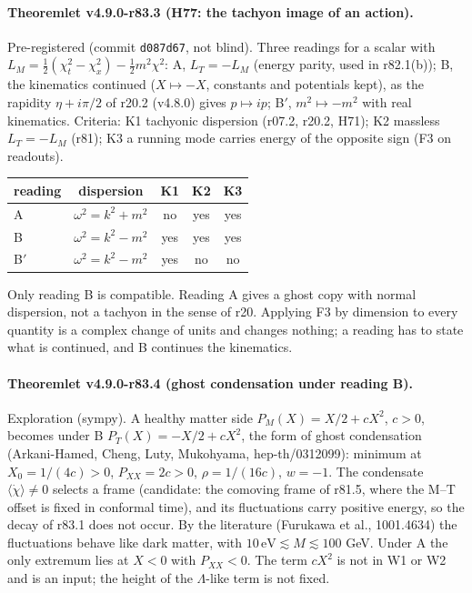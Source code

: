 \paragraph{Theoremlet v4.9.0-r83.3 (H77: the tachyon image of an action).}
Pre-registered (commit \texttt{d087d67}, not blind).  Three readings for a scalar with \(L_M=\tfrac12(\chi_t^2-\chi_x^2)-\tfrac12m^2\chi^2\):
A, \(L_T=-L_M\) (energy parity, used in r82.1(b)); B, the kinematics continued (\(X\mapsto-X\), constants and potentials kept), as the
rapidity \(\eta+i\pi/2\) of r20.2 (v4.8.0) gives \(p\mapsto ip\); B\('\), \(m^2\mapsto-m^2\) with real kinematics.  Criteria: K1 tachyonic
dispersion (r07.2, r20.2, H71); K2 massless \(L_T=-L_M\) (r81); K3 a running mode carries energy of the opposite sign (F3 on readouts).
\begin{center}
\small
\begin{tabular}{@{}lcccc@{}}
\toprule
reading & dispersion & K1 & K2 & K3\\
\midrule
A & \(\omega^2=k^2+m^2\) & no & yes & yes\\
B & \(\omega^2=k^2-m^2\) & yes & yes & yes\\
B\('\) & \(\omega^2=k^2-m^2\) & yes & no & no\\
\bottomrule
\end{tabular}
\end{center}
Only reading B is compatible.  Reading A gives a ghost copy with normal dispersion, not a tachyon in the sense of r20.  Applying F3 by
dimension to every quantity is a complex change of units and changes nothing; a reading has to state what is continued, and B continues
the kinematics.

\paragraph{Theoremlet v4.9.0-r83.4 (ghost condensation under reading B).}
Exploration (sympy).  A healthy matter side \(P_M(X)=X/2+cX^2\), \(c>0\), becomes under B \(P_T(X)=-X/2+cX^2\), the form of ghost
condensation (Arkani-Hamed, Cheng, Luty, Mukohyama, hep-th/0312099): minimum at \(X_0=1/(4c)>0\), \(P_{XX}=2c>0\), \(\rho=1/(16c)\),
\(w=-1\).  The condensate \(\langle\dot\chi\rangle\neq0\) selects a frame (candidate: the comoving frame of r81.5, where the M--T offset is
fixed in conformal time), and its fluctuations carry positive energy, so the decay of r83.1 does not occur.  By the literature
(Furukawa et al., 1001.4634) the fluctuations behave like dark matter, with \(10\,\mathrm{eV}\lesssim M\lesssim100\) GeV.  Under A the only
extremum lies at \(X<0\) with \(P_{XX}<0\).  The term \(cX^2\) is not in W1 or W2 and is an input; the height of the \(\Lambda\)-like term
is not fixed.

